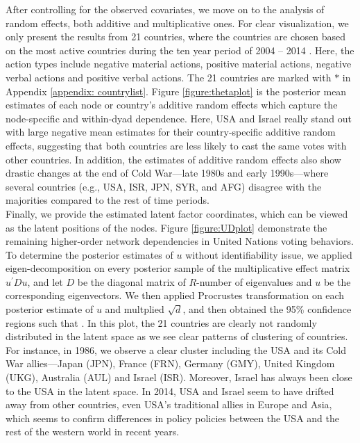 \documentclass[a4paper]{article}
\begin{document}
 \newline\noindent After controlling for the observed covariates, we move on to the analysis of random effects, both additive and multiplicative ones. For clear visualization, we only present the results from 21 countries, where the countries are chosen based on the most active countries during the ten year period of 2004 -- 2014 \citep{hoff2015multilinear}. Here, the action types include negative material actions, positive material actions, negative verbal actions and positive verbal actions. The 21 countries are marked with $*$ in Appendix \ref{appendix: countrylist}. Figure \ref{figure:thetaplot} is the posterior mean estimates of each node or country's additive random effects which capture the node-specific and within-dyad dependence. Here, USA and Israel really stand out with large negative mean estimates for their country-specific additive random effects, suggesting that both countries are less likely to cast the same votes with other countries. In addition, the estimates of additive random effects also show drastic changes at the end of Cold War---late 1980s and early 1990s---where several countries (e.g., USA, ISR, JPN, SYR, and AFG) disagree with the majorities compared to the rest of time periods.\\ \newline
Finally, we provide the estimated latent factor coordinates, which can be viewed as the latent positions of the nodes.  Figure \ref{figure:UDplot} demonstrate the remaining higher-order network dependencies in United Nations voting behaviors. To determine the posterior estimates of $u$ without identifiability issue, we applied eigen-decomposition on every posterior sample of the multiplicative effect matrix $u^\prime Du$, and let $D$ be the diagonal matrix of $R$-number of eigenvalues and $u$ be the corresponding eigenvectors. We then applied Procrustes transformation on each posterior estimate of $u$ and multplied $\sqrt{d}$, and then obtained the 95\% confidence regions such that . In this plot, the 21 countries are clearly not randomly distributed in the latent space as we see clear patterns of clustering of countries. For instance, in 1986, we observe a clear cluster including the USA and its Cold War allies---Japan (JPN), France (FRN), Germany (GMY), United Kingdom (UKG), Australia (AUL) and Israel (ISR). Moreover, Israel has always been close to the USA in the latent space. In 2014, USA and Israel seem to have drifted away from other countries, even USA's traditional allies in Europe and Asia, which seems to confirm differences in policy policies between the USA and the rest of the western world in recent years.   
\end{document}
